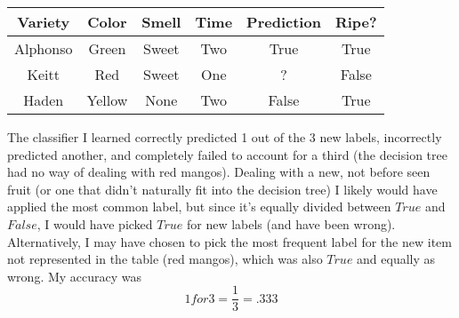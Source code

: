 \documentclass[11pt,a4paper,draft]{article}
\begin{document}
\begin{enumerate}
\begin{enumerate}
				\begin{table}[h!]
					\centering
					\begin{tabular}{cccc|cc}
						\hline
						Variety & Color  & Smell  & Time & Prediction & Ripe?  \\ \hline
						Alphonso& Green  & Sweet  & Two  & True  & True        \\
						Keitt   & Red    & Sweet  & One  & ?     & False       \\
						Haden   & Yellow & None   & Two  & False & True        \\ \hline
					\end{tabular}
				\end{table}
			The classifier I learned correctly predicted 1 out of the 3 new labels, incorrectly predicted another, and completely failed to account for a third (the decision tree had no way of dealing with red mangos). Dealing with a new, not before seen fruit (or one that didn't naturally fit into the decision tree) I likely would have applied the most common label, but since it's equally divided between $True$ and $False$, I would have picked $True$ for new labels (and have been wrong). Alternatively, I may have chosen to pick the most frequent label for the new item not represented in the table (red mangos), which was also $True$ and equally as wrong. My accuracy was 
			$$1 for 3 = \frac{1}{3} = .333$$
		\end{enumerate}
	

\end{enumerate}
\end{document}

